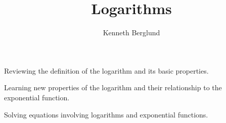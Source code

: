 \documentclass{ximera}
\author{Kenneth Berglund}
\title{Logarithms}
\begin{document}
\begin{abstract}
\end{abstract}
\maketitle


\begin{objectives}
	\item Reviewing the definition of the logarithm and its basic properties.
	\item Learning new properties of the logarithm and their relationship to the exponential function.
	\item Solving equations involving logarithms and exponential functions. 
\end{objectives}
\end{document}

